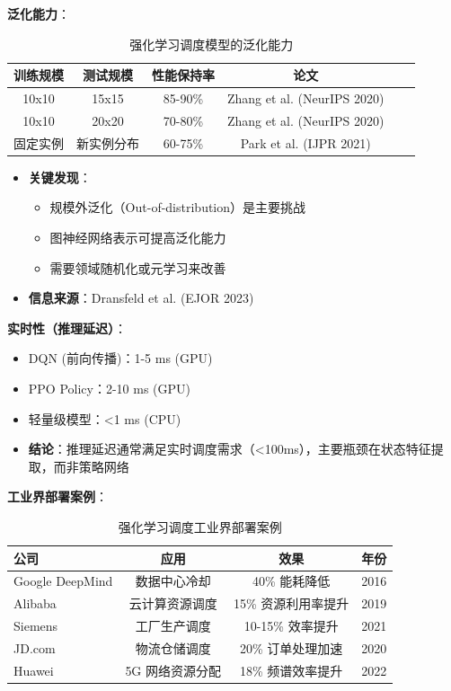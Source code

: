 \documentclass[12pt,a4paper]{article}
\begin{document}
\textbf{泛化能力}：

\begin{table}[h]
\centering
\caption{强化学习调度模型的泛化能力}
\label{tab:rl-generalization}
\begin{tabular}{@{}cccccl@{}}
\toprule
\textbf{训练规模} & \textbf{测试规模} & \textbf{性能保持率} & \textbf{论文} \\
\midrule
10x10 & 15x15 & 85-90\% & Zhang et al. (NeurIPS 2020) \\
10x10 & 20x20 & 70-80\% & Zhang et al. (NeurIPS 2020) \\
固定实例 & 新实例分布 & 60-75\% & Park et al. (IJPR 2021) \\
\bottomrule
\end{tabular}
\end{table}

\begin{itemize}
    \item \textbf{关键发现}：
    \begin{itemize}
        \item 规模外泛化（Out-of-distribution）是主要挑战
        \item 图神经网络表示可提高泛化能力
        \item 需要领域随机化或元学习来改善
    \end{itemize}
    
    \item \textbf{信息来源}：Dransfeld et al. (EJOR 2023)\cite{dransfeld2023generalization}
\end{itemize}

\textbf{实时性（推理延迟）}：

\begin{itemize}
    \item DQN (前向传播)：1-5 ms (GPU)
    \item PPO Policy：2-10 ms (GPU)
    \item 轻量级模型：<1 ms (CPU)
    \item \textbf{结论}：推理延迟通常满足实时调度需求（<100ms），主要瓶颈在状态特征提取，而非策略网络
\end{itemize}

\textbf{工业界部署案例}：

\begin{table}[h]
\centering
\caption{强化学习调度工业界部署案例}
\label{tab:rl-industry}
\begin{tabular}{@{}lccc@{}}
\toprule
\textbf{公司} & \textbf{应用} & \textbf{效果} & \textbf{年份} \\
\midrule
Google DeepMind & 数据中心冷却 & 40\% 能耗降低 & 2016 \\
Alibaba & 云计算资源调度 & 15\% 资源利用率提升 & 2019 \\
Siemens & 工厂生产调度 & 10-15\% 效率提升 & 2021 \\
JD.com & 物流仓储调度 & 20\% 订单处理加速 & 2020 \\
Huawei & 5G 网络资源分配 & 18\% 频谱效率提升 & 2022 \\
\bottomrule
\end{tabular}
\end{table}
\end{document}
